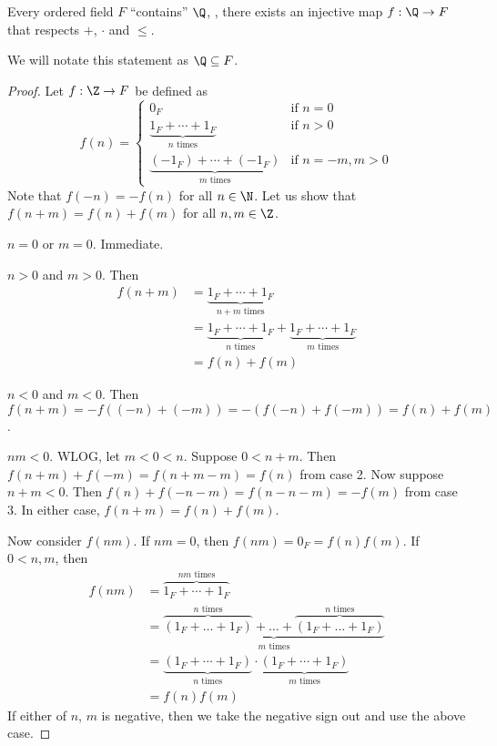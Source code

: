 \begin{theorem}
    Every ordered field $F$ ``contains'' $\Q$, \ie, there exists an injective
    map $f : \Q \to F$ that respects $+$, $\cdot$ and $\le$.
\end{theorem}
We will notate this statement as $\Q \subseteq F$.
\begin{proof}
    Let $f : \Z \to F$ be defined as \[
        f(n) = \begin{cases}
            0_F & \text{if } n = 0 \\
            \underbrace{1_F + \cdots + 1_F}_{n \text{ times}} & \text{if } n > 0 \\
            \underbrace{(-1_F) + \cdots + (-1_F)}_{m \text{ times}} & \text{if } n = -m, m > 0
        \end{cases}
    \]
    Note that $f(-n) = -f(n)$ for all $n \in \N$.
    Let us show that $f(n + m) = f(n) + f(m)$ for all $n, m \in \Z$.
    \begin{casework}
        \item $n = 0$ or $m = 0$. Immediate.
        \item $n > 0$ and $m > 0$.
        Then \begin{align*}
            f(n + m) &= \underbrace{1_F + \cdots + 1_F}_{n + m \text{ times}} \\
                     &= \underbrace{1_F + \cdots + 1_F}_{n \text{ times}} +
                        \underbrace{1_F + \cdots + 1_F}_{m \text{ times}} \\
                     &= f(n) + f(m)
        \end{align*}
        \item $n < 0$ and $m < 0$.
        Then $f(n + m) = -f((-n) + (-m)) = -(f(-n) + f(-m)) = f(n) + f(m)$.
        \item $nm < 0$. WLOG, let $m < 0 < n$.
        Suppose $0 < n + m$.
        Then $f(n + m) + f(-m) = f(n + m - m) = f(n)$ from case 2.
        Now suppose $n + m < 0$.
        Then $f(n) + f(-n-m) = f(n - n - m) = -f(m)$ from case 3.
        In either case, $f(n + m) = f(n) + f(m)$.
    \end{casework}
    Now consider $f(nm)$.
    If $nm = 0$, then $f(nm) = 0_F = f(n)f(m)$.
    If $0 < n, m$, then \begin{align*}
        f(nm) &= \overbrace{1_F + \cdots + 1_F}^{nm \text{ times}} \\
              &= \underbrace{\overbrace{(1_F + \dots + 1_F)}^{n \text{ times}} +
                \dots + \overbrace{(1_F + \dots + 1_F)}^{n \text{ times}}}_{m \text{ times}} \\
              &= \underbrace{(1_F + \cdots + 1_F)}_{n \text{ times}}
                \cdot \underbrace{(1_F + \cdots + 1_F)}_{m \text{ times}} \\
              &= f(n) f(m)
    \end{align*}
    If either of $n$, $m$ is negative, then we take the negative sign out and
    use the above case.


\end{proof}
